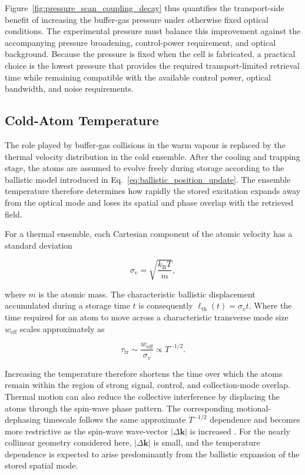 Figure~\ref{fig:pressure_scan_coupling_decay} thus quantifies the transport-side benefit of increasing the buffer-gas pressure under otherwise fixed optical conditions. The experimental pressure must balance this improvement against the accompanying pressure broadening, control-power requirement, and optical background. Because the pressure is fixed when the cell is fabricated, a practical choice is the lowest pressure that provides the required transport-limited retrieval time while remaining compatible with the available control power, optical bandwidth, and noise requirements.

\subsection{Cold-Atom Temperature}
\label{sec:results_cold_atom_temperature}

The role played by buffer-gas collisions in the warm vapour is replaced by the thermal velocity distribution in the cold ensemble. After the cooling and trapping stage, the atoms are assumed to evolve freely during storage according to the ballistic model introduced in Eq.~\eqref{eq:ballistic_position_update}. The ensemble temperature therefore determines how rapidly the stored excitation expands away from the optical mode and loses its spatial and phase overlap with the retrieved field.

For a thermal ensemble, each Cartesian component of the atomic velocity has a standard deviation

\begin{equation}
    \sigma_v
    =
    \sqrt{\frac{k_{\mathrm{B}}T}{m}},
    \label{eq:cold_atom_thermal_velocity}
\end{equation}

where \(m\) is the atomic mass. The characteristic ballistic displacement accumulated during a storage time \(t\) is consequently $\ell_{\mathrm{th}}(t)=\sigma_v t. $ Where the time required for an atom to move across a characteristic transverse mode size \(w_{\mathrm{eff}}\) scales approximately as

\begin{equation}
    \tau_{\mathrm{tr}}
    \sim
    \frac{w_{\mathrm{eff}}}{\sigma_v}
    \propto
    T^{-1/2}.
    \label{eq:cold_atom_transit_time}
\end{equation}

Increasing the temperature therefore shortens the time over which the atoms remain within the region of strong signal, control, and collection-mode overlap. Thermal motion can also reduce the collective interference by displacing the atoms through the spin-wave phase pattern. The corresponding motional-dephasing timescale follows the same approximate \(T^{-1/2}\) dependence and becomes more restrictive as the spin-wave wave-vector \(\lvert\Delta\mathbf{k}\rvert\) is increased \cite{JiangEtAl_2016}. For the nearly collinear geometry considered here, \(\lvert\Delta\mathbf{k}\rvert\) is small, and the temperature dependence is expected to arise predominantly from the ballistic expansion of the stored spatial mode.

